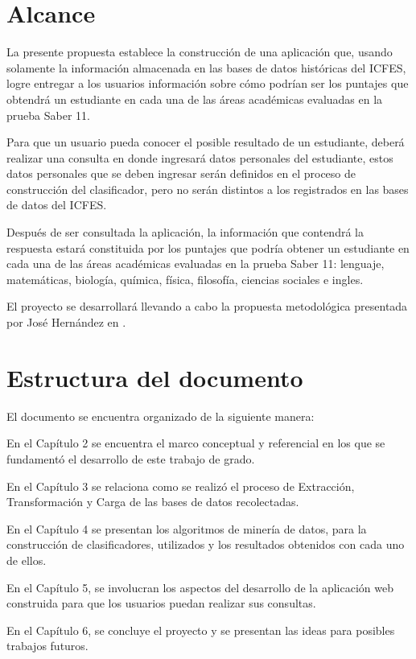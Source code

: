 \section{Alcance}
La presente propuesta establece la construcción de una aplicación que, usando solamente la información almacenada en las bases de datos históricas del ICFES, logre entregar a los usuarios información sobre cómo podrían ser los puntajes que obtendrá un estudiante en cada una de las áreas académicas evaluadas en la prueba Saber 11\degree. 

Para que un usuario pueda conocer el posible resultado de un estudiante, deberá realizar una consulta en donde ingresará datos personales del estudiante, estos datos personales que se deben ingresar serán definidos en el proceso de construcción del clasificador, pero no serán distintos a los registrados en las bases de datos del ICFES.

Después de ser consultada la aplicación, la información que contendrá la respuesta estará constituida por los puntajes que podría obtener un estudiante en cada una de las áreas académicas evaluadas en la prueba Saber 11\degree: lenguaje, matemáticas, biología, química, física, filosofía, ciencias sociales e ingles.

El proyecto se desarrollará llevando a cabo la propuesta metodológica presentada por José Hernández en \cite{key-50}.
\section{Estructura del documento}
El documento se encuentra organizado de la siguiente manera:

En el Capítulo 2 se encuentra el marco conceptual y referencial en los que se fundamentó el desarrollo de este trabajo de grado.

En el Capítulo 3 se relaciona como se realizó el proceso de Extracción, Transformación y Carga de las bases de datos recolectadas.

En el Capítulo 4 se presentan los algoritmos de minería de datos, para la construcción de clasificadores, utilizados y los resultados obtenidos con cada uno de ellos.

En el Capítulo 5, se involucran los aspectos del desarrollo de la aplicación web construida para que los usuarios puedan realizar sus consultas.

En el Capítulo 6, se concluye el proyecto y se presentan las ideas para posibles trabajos futuros.